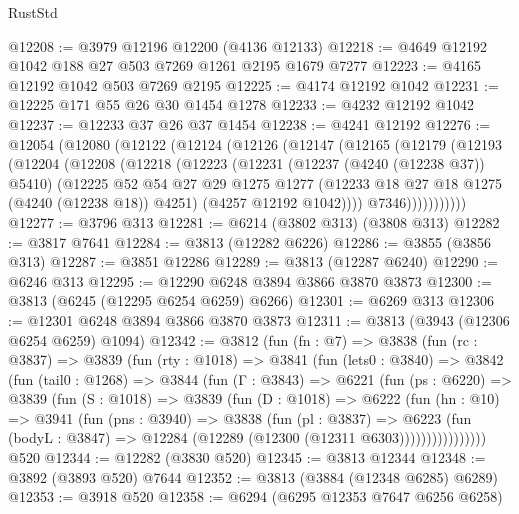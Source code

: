 \begin{lexlean}{RustStd}
\begin{coremodule}
{\begin{coremodule}
{{{{{{{{{{{{{{{{{{{{{{{{{{{{{{{{{{{@12208 := @3979 @12196 @12200 (@4136 @12133)
@12218 := @4649 @12192 @1042 @188 @27 @503 @7269 @1261 @2195 @1679 @7277
@12223 := @4165 @12192 @1042 @503 @7269 @2195
@12225 := @4174 @12192 @1042
@12231 := @12225 @171 @55 @26 @30 @1454 @1278
@12233 := @4232 @12192 @1042
@12237 := @12233 @37 @26 @37 @1454
@12238 := @4241 @12192
@12276 := @12054
    (@12080
      (@12122
        (@12124
          (@12126
            (@12147
              (@12165
                (@12179
                  (@12193
                    (@12204
                      (@12208
                        (@12218
                          (@12223
                            (@12231
                              (@12237 (@4240 (@12238 @37)) @5410)
                              (@12225
                                @52
                                @54
                                @27
                                @29
                                @1275
                                @1277
                                (@12233 @18 @27 @18 @1275 (@4240 (@12238 @18)) @4251)
                                (@4257 @12192 @1042))))
                          @7346)))))))))))
@12277 := @3796 @313
@12281 := @6214 (@3802 @313) (@3808 @313)
@12282 := @3817 @7641
@12284 := @3813 (@12282 @6226)
@12286 := @3855 (@3856 @313)
@12287 := @3851 @12286
@12289 := @3813 (@12287 @6240)
@12290 := @6246 @313
@12295 := @12290 @6248 @3894 @3866 @3870 @3873
@12300 := @3813 (@6245 (@12295 @6254 @6259) @6266)
@12301 := @6269 @313
@12306 := @12301 @6248 @3894 @3866 @3870 @3873
@12311 := @3813 (@3943 (@12306 @6254 @6259) @1094)
@12342 := @3812
    (fun (fn : @7) =>
    @3838
      (fun (rc : @3837) =>
      @3839
        (fun (rty : @1018) =>
        @3841
          (fun (lets0 : @3840) =>
          @3842
            (fun (tail0 : @1268) =>
            @3844
              (fun (Γ : @3843) =>
              @6221
                (fun (ps : @6220) =>
                @3839
                  (fun (S : @1018) =>
                  @3839
                    (fun (D : @1018) =>
                    @6222
                      (fun (hn : @10) =>
                      @3941
                        (fun (pns : @3940) =>
                        @3838
                          (fun (pl : @3837) =>
                          @6223
                            (fun (bodyL : @3847) =>
                            @12284 (@12289 (@12300 (@12311 @6303))))))))))))))))
    @520
@12344 := @12282 (@3830 @520)
@12345 := @3813 @12344
@12348 := @3892 (@3893 @520) @7644
@12352 := @3813 (@3884 (@12348 @6285) @6289)
@12353 := @3918 @520
@12358 := @6294 (@6295 @12353 @7647 @6256 @6258)
}}}}}}}}}}}}}}}}}}}}}}}}}}}}}}}}}}}
\end{coremodule}}
\end{coremodule}
\end{lexlean}
